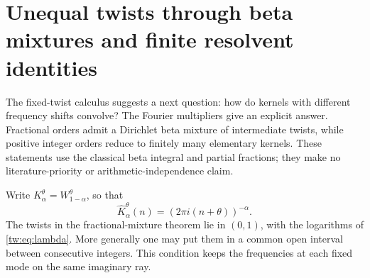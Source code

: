 \section{Unequal twists through beta mixtures and finite resolvent identities}
\label{mxtw:sec:main}
The fixed-twist calculus suggests a next question: how do kernels with
different frequency shifts convolve? The Fourier multipliers give an
explicit answer. Fractional orders admit a Dirichlet beta mixture of
intermediate twists, while positive integer orders reduce to finitely
many elementary kernels. These statements use the classical beta
integral and partial fractions; they make no literature-priority or
arithmetic-independence claim.

Write $K_\alpha^\theta=W_{1-\alpha}^\theta$, so that
\[
 \widehat K_\alpha^\theta(n)
       =(2\pi i(n+\theta))^{-\alpha}.
\]
The twists in the fractional-mixture theorem lie in $(0,1)$, with the
logarithms of \eqref{tw:eq:lambda}. More generally one may put them in a common
open interval between consecutive integers. This condition keeps the
frequencies at each fixed mode on the same imaginary ray.

